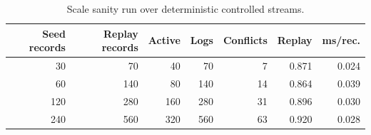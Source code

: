\begin{table}[t]
\caption{Scale sanity run over deterministic controlled streams.}
\label{tab:scale}
\begin{tabular*}{\hsize}{@{\extracolsep{\fill}}rrrrrrr@{}}
\toprule
Seed records & Replay records & Active & Logs & Conflicts & Replay & ms/rec.\\
\midrule
30 & 70 & 40 & 70 & 7 & 0.871 & 0.024\\
60 & 140 & 80 & 140 & 14 & 0.864 & 0.039\\
120 & 280 & 160 & 280 & 31 & 0.896 & 0.030\\
240 & 560 & 320 & 560 & 63 & 0.920 & 0.028\\
\bottomrule
\end{tabular*}
\end{table}

